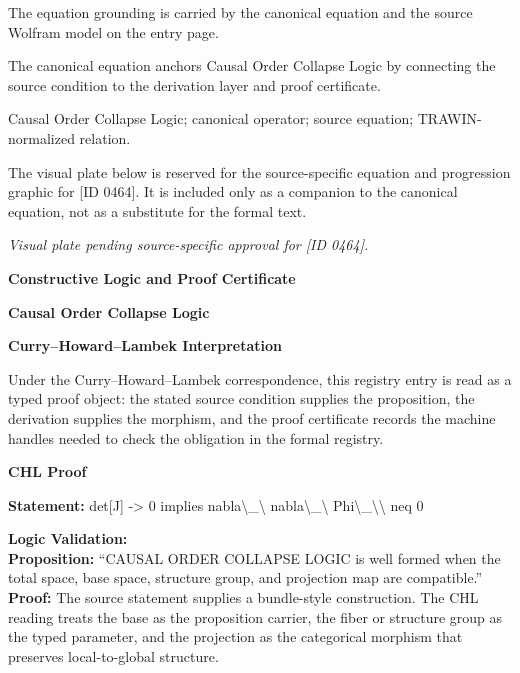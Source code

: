 The equation grounding is carried by the canonical equation and the source Wolfram model on the entry page.

The canonical equation anchors Causal Order Collapse Logic by connecting the source condition to the derivation layer and proof certificate.

Causal Order Collapse Logic; canonical operator; source equation; TRAWIN-normalized relation.
\endgroup

\begingroup\footnotesize\sloppy
The visual plate below is reserved for the source-specific equation and progression graphic for [ID 0464]. It is included only as a companion to the canonical equation, not as a substitute for the formal text.
\par\endgroup
\begingroup\footnotesize\itshape
Visual plate pending source-specific approval for [ID 0464].
\par\endgroup

\clearpage
\begingroup\tzpsupportsetup
\noindent\textbf{\fontsize{10.8pt}{12.8pt}\selectfont [ID 0464] Constructive Logic and Proof Certificate}\par
\noindent\textbf{\fontsize{10pt}{12pt}\selectfont Causal Order Collapse Logic}\par
\vspace{0.45em}
\begingroup
\footnotesize
\setlength{\parskip}{0.22em}
\setlength{\parindent}{0pt}
\noindent\textbf{Curry--Howard--Lambek Interpretation}\par
Under the Curry--Howard--Lambek correspondence, this registry entry is read as a typed proof
object: the stated source condition supplies the proposition, the derivation supplies the
morphism, and the proof certificate records the machine handles needed to check the obligation
in the formal registry.

\vspace{0.45em}
\noindent\textbf{CHL Proof}\par
\textbf{Statement:} det[J] -> 0 implies nabla\textbackslash{}\_\textbackslash{} nabla\textbackslash{}\_\textbackslash{} Phi\textbackslash{}\_\textbackslash{}\textbackslash{} neq 0

\textbf{Logic Validation:}\\
\textbf{Proposition:} ``CAUSAL ORDER COLLAPSE LOGIC is well formed when the total space, base space, structure
group, and projection map are compatible.''\\
\textbf{Proof:} The source statement supplies a bundle-style construction. The CHL reading treats the
base as the proposition carrier, the fiber or structure group as the typed parameter,
and the projection as the categorical morphism that preserves local-to-global structure.

